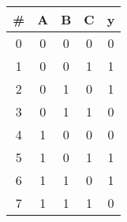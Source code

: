 \documentclass[12pt]{article}
\begin{document}
\begin{figure}[h!]
\begin{minipage}{0.2\textwidth}
        \begin{tabular}{|c|c|c|c|c|}
            \hline
            \# & A & B & C & y \\ \hline
            0  & 0 & 0 & 0 & 0 \\ \hline
            1  & 0 & 0 & 1 & 1 \\ \hline
            2  & 0 & 1 & 0 & 1 \\ \hline
            3  & 0 & 1 & 1 & 0 \\ \hline
            4  & 1 & 0 & 0 & 0 \\ \hline
            5  & 1 & 0 & 1 & 1 \\ \hline
            6  & 1 & 1 & 0 & 1 \\ \hline
            7  & 1 & 1 & 1 & 0 \\ \hline
        \end{tabular}
    \end{minipage}
\end{figure}
\end{document}
